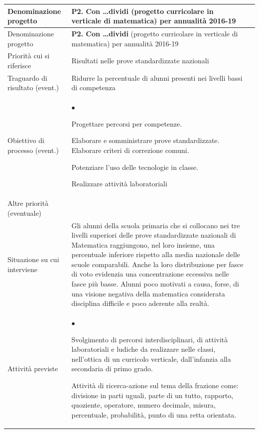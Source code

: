\documentclass[12pt,a4paper,oneside]{memoir}
\newenvironment{elenco}{\begin{list}{$\bullet$}{%
              \setlength{\leftmargin}{4mm}%
              \setlength{\rightmargin}{1mm}%
               \setlength{\itemindent}{0mm}%
               \setlength{\labelwidth}{2mm}%
               \setlength{\labelsep}{2mm}%
              \setlength{\itemsep}{-\parsep}%
              \setlength{\partopsep}{0pt}%
              \setlength{\topsep}{0pt}%
             \setlength{\parskip}{0pt}%
              }}{\end{list}}
\begin{document}
\begin{footnotesize}
\begin{longtable}{|>{\raggedright}p{2.5cm}|>{\raggedright\arraybackslash}P{10cm}|}
\hline
{}
\label{P2}Denominazione progetto&\textbf{P2. Con \ldots dividi} (progetto curricolare in verticale di matematica) per annualità 2016-19\\ \hline \endfirsthead
\hline
{}
Denominazione progetto&\textbf{P2. Con \ldots dividi} (progetto curricolare in verticale di matematica) per annualità 2016-19\\ \hline \endhead
{}
\endfoot
\hline
\endlastfoot
Priorità cui si riferisce&Risultati nelle prove standardizzate nazionali\\ \hline
Traguardo di risultato (event.)& Ridurre la percentuale di alunni presenti nei livelli bassi di competenza\\ \hline
Obiettivo di processo (event.)&\begin{elenco}
\item Progettare percorsi per competenze.
\item Elaborare e somministrare prove standardizzate. Elaborare criteri di correzione comuni.
\item Potenziare l'uso delle tecnologie in classe.
\item Realizzare attività laboratoriali
\end{elenco}\\[-4mm] \hline
Altre priorità (eventuale)&\\ \hline
Situazione su cui interviene&Gli alunni della scuola primaria che si collocano nei tre livelli superiori delle prove standardizzate nazionali di Matematica raggiungono, nel loro insieme, una percentuale inferiore rispetto alla media nazionale delle scuole comparabili.
Anche la loro distribuzione per fasce di voto evidenzia una concentrazione eccessiva nelle fasce più basse.
Alunni poco motivati a causa, forse, di una visione negativa della matematica considerata disciplina difficile e poco aderente alla realtà. \\ \hline
Attività previste&
\begin{elenco}
\item Svolgimento di percorsi interdisciplinari, di attività laboratoriali e ludiche da realizzare nelle classi, nell'ottica di un curricolo verticale, dall'infanzia alla secondaria di primo grado. 
\item Attività di ricerca-azione sul tema della frazione come: divisione in parti uguali, parte di un tutto, rapporto, quoziente, operatore, numero decimale, misura, percentuale, probabilità, punto di una retta orientata.

\end{elenco}
\end{longtable}
\end{footnotesize}
\end{document}
